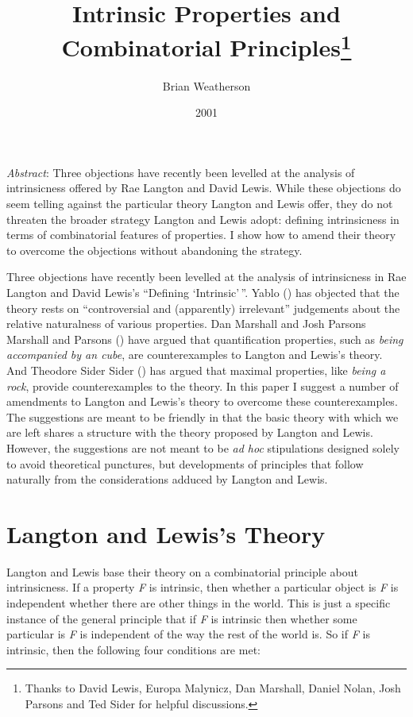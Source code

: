 \documentclass[
  11pt,
  letterpaper,
  DIV=11,
  numbers=noendperiod,
  twoside]{scrartcl}
\title{Intrinsic Properties and Combinatorial Principles\thanks{Thanks
to David Lewis, Europa Malynicz, Dan Marshall, Daniel Nolan, Josh
Parsons and Ted Sider for helpful discussions.}}
\author{Brian Weatherson}
\date{2001}
\renewenvironment{abstract}
 {\vspace{-1.25cm}
 \quotation\small\noindent\emph{Abstract}:}
 {\endquotation}
\begin{document}
\maketitle
\begin{abstract}
Three objections have recently been levelled at the analysis of
intrinsicness offered by Rae Langton and David Lewis. While these
objections do seem telling against the particular theory Langton and
Lewis offer, they do not threaten the broader strategy Langton and Lewis
adopt: defining intrinsicness in terms of combinatorial features of
properties. I show how to amend their theory to overcome the objections
without abandoning the strategy.
\end{abstract}


Three objections have recently been levelled at the analysis of
intrinsicness in Rae Langton and David Lewis's ``Defining
`Intrinsic'\,''. Yablo () has objected
that the theory rests on ``controversial and (apparently) irrelevant''
judgements about the relative naturalness of various properties. Dan
Marshall and Josh Parsons Marshall and Parsons
() have argued that quantification
properties, such as \emph{being accompanied by an cube}, are
counterexamples to Langton and Lewis's theory. And Theodore Sider Sider
() has argued that maximal properties,
like \emph{being a rock}, provide counterexamples to the theory. In this
paper I suggest a number of amendments to Langton and Lewis's theory to
overcome these counterexamples. The suggestions are meant to be friendly
in that the basic theory with which we are left shares a structure with
the theory proposed by Langton and Lewis. However, the suggestions are
not meant to be \emph{ad hoc} stipulations designed solely to avoid
theoretical punctures, but developments of principles that follow
naturally from the considerations adduced by Langton and Lewis.

\section{Langton and Lewis's Theory}\label{langton-and-lewiss-theory}

Langton and Lewis base their theory on a combinatorial principle about
intrinsicness. If a property \emph{F} is intrinsic, then whether a
particular object is \emph{F} is independent whether there are other
things in the world. This is just a specific instance of the general
principle that if \emph{F} is intrinsic then whether some particular is
\emph{F} is independent of the way the rest of the world is. So if
\emph{F} is intrinsic, then the following four conditions are met:
\end{document}
